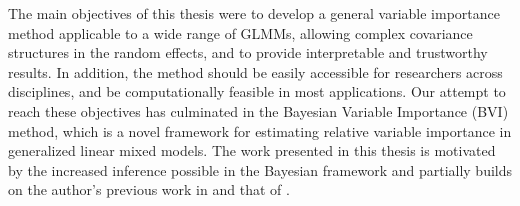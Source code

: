 The main objectives of this thesis were to develop a general variable importance method applicable to a wide range of GLMMs, allowing complex covariance structures in the random effects, and to provide interpretable and trustworthy results. In addition, the method should be easily accessible for researchers across disciplines, and be computationally feasible in most applications. Our attempt to reach these objectives has culminated in the Bayesian Variable Importance (BVI) method, which is a novel framework for estimating relative variable importance in generalized linear mixed models. The work presented in this thesis is motivated by the increased inference possible in the Bayesian framework and partially builds on the author's previous work in \citet{Arnstad:Relative_variable_importance_in_Bayesian_linear_mixed_models:2024} and that of \citet{matre}.
\\
\\
